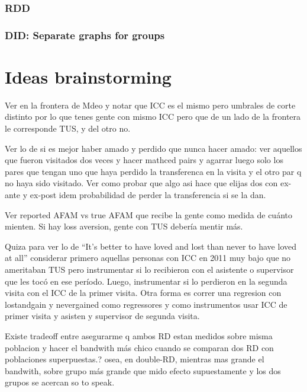 \documentclass[12pt]{article}
\begin{document}
\subsubsection{RDD}


\subsubsection{DID: Separate graphs for groups}



\section{Ideas brainstorming}
Ver en la frontera de Mdeo y notar que ICC es el mismo pero umbrales de corte distinto por lo que tenes gente con mismo ICC pero que de un lado de la frontera le corresponde TUS, y del otro no.

Ver lo de si es mejor haber amado y perdido que nunca hacer amado: ver aquellos que fueron visitados dos veces y hacer mathced pairs y agarrar luego solo los pares que tengan uno que haya perdido la transferenca en la visita y el otro par q no haya sido visitado. Ver como probar que algo asi hace que elijas dos con ex-ante y ex-post idem probabilidad de perder la transferencia si se la dan.

Ver reported AFAM vs true AFAM que recibe la gente como medida de cuánto mienten. Si hay loss aversion, gente con TUS debería mentir más.

Quiza para ver lo de ``It's better to have loved and lost than never to have loved at all'' considerar primero aquellas personas con ICC en 2011 muy bajo que no ameritaban TUS pero instrumentar si lo recibieron con el asistente o supervisor que les tocó en ese período. Luego, instrumentar si lo perdieron en la segunda visita con el ICC de la primer visita. Otra forma es correr una regresion con lostandgain y nevergained como regressores y como instrumentos usar ICC de primer visita y asisten y supervisor de segunda visita.

Existe tradeoff entre asegurarme q ambos RD estan medidos sobre misma poblacion y hacer el bandwith más chico cuando se comparan dos RD con poblaciones superpuestas.? osea, en double-RD, mientras mas grande el bandwith, sobre grupo más grande que mido efecto supuestamente y los dos grupos se acercan so to speak.
\end{document}
